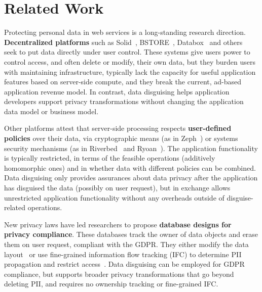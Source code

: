 \section{Related Work}
\label{sec:related}

%
Protecting personal data in web services is a long-standing research direction.
%
\textbf{Decentralized platforms} such as Solid~\cite{solid}, BSTORE~\cite{bstore},
Databox~\cite{databox} and others~\cite{diy, amber, oort, w5, blockstack}
seek to put data directly under user control.
%
These systems give users power to control access, and often delete or modify, their
own data, but they burden users with maintaining infrastructure, typically lack the
capacity for useful application features based on server-side compute, and they break
the current, ad-based application revenue model.
%
In contrast, data disguising helps application developers support privacy
transformations without changing the application data model or business model.
%

%
Other platforms attest that server-side processing respects
\textbf{user-defined policies} over their data, via cryptographic means (as in
\eg Zeph~\cite{zeph}) or systems security mechanisms (as in \eg Riverbed~\cite{riverbed}
and Ryoan~\cite{ryoan}).
%
The application functionality is typically restricted, in terms of the feasible
operations (\eg additively homomorphic ones) and in whether data with different policies
can be combined.
%
Data disguising only provides assurances about data privacy after the application has
disguised the data (possibly on user request), but in exchange allows unrestricted
application functionality without any overheads outside of disguise-related
operations.
%

%
New privacy laws have led researchers to propose \textbf{database designs
for privacy compliance}.
%
These databases track the owner of data objects and erase them on user request, compliant
with \eg the GDPR.
%
They either modify the data layout~\cite{usershards} or use fine-grained information flow
tracking (IFC) to determine PII propagation and restrict access~\cite{schengendb}.
%
Data disguising can be employed for GDPR compliance, but supports broader privacy
transformations that go beyond deleting PII, and requires no ownership tracking or
fine-grained IFC.
%

